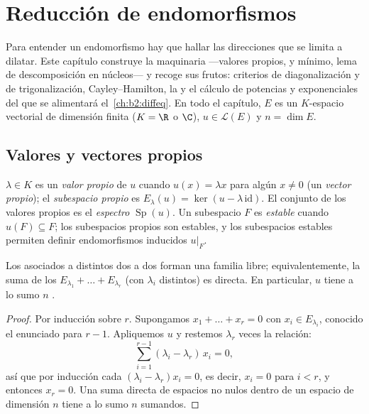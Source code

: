 \chapter{Reducción de endomorfismos}\label{ch:b2:reduction}

Para entender un endomorfismo hay que hallar las direcciones que se
limita a dilatar. Este capítulo construye la maquinaria
---valores propios,  y
mínimo, lema de descomposición en núcleos--- y recoge sus frutos:
criterios de diagonalización y de trigonalización, Cayley--Hamilton,
la  y el cálculo de potencias y
exponenciales del que se alimentará el~\cref{ch:b2:diffeq}. En todo el
capítulo, $E$ es un $K$-espacio vectorial de dimensión finita ($K = \R$
o $\C$), $u \in \mathcal{L}(E)$ y $n = \dim E$.

\section{Valores y vectores propios}

\begin{definition}\label{def:b2:reduction:eigen}
$\lambda \in K$ es un \emph{valor propio} de $u$
cuando $u(x) = \lambda x$ para algún $x \neq 0$ (un \emph{vector
propio}); el \emph{subespacio propio} es $E_\lambda(u) = \ker(u -
\lambda\,\mathrm{id})$. El conjunto de los valores propios es el
\emph{espectro} $\operatorname{Sp}(u)$. Un subespacio
$F$ es \emph{estable} cuando $u(F) \subseteq F$; los subespacios
propios son estables, y los subespacios estables permiten definir
endomorfismos inducidos $u|_F$.
\end{definition}

\begin{theorem}\label{thm:b2:reduction:independence}
Los  asociados a  distintos dos a
dos forman una familia libre; equivalentemente, la suma de los
 $E_{\lambda_1} + \dots + E_{\lambda_r}$ (con
$\lambda_i$ distintos) es directa. En particular, $u$ tiene a lo sumo
$n$ .
\end{theorem}

\begin{proof}
Por inducción sobre $r$. Supongamos $x_1 + \dots + x_r = 0$ con $x_i
\in E_{\lambda_i}$, conocido el enunciado para $r - 1$. Apliquemos $u$
y restemos $\lambda_r$ veces la relación:
\[
\sum_{i=1}^{r-1} (\lambda_i - \lambda_r)\, x_i = 0 ,
\]
así que por inducción cada $(\lambda_i - \lambda_r)x_i = 0$, es decir,
$x_i = 0$ para $i < r$, y entonces $x_r = 0$. Una suma directa de
espacios no nulos dentro de un espacio de dimensión $n$ tiene a lo
sumo $n$ sumandos.
\end{proof}

